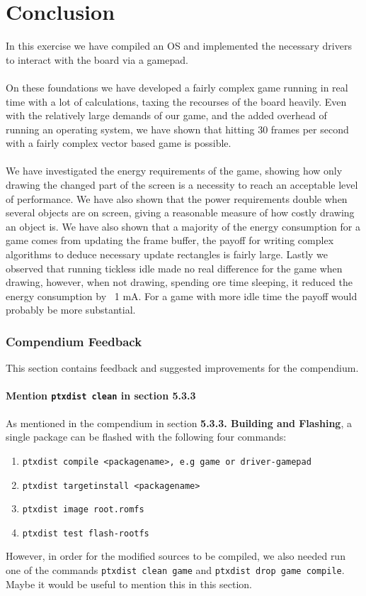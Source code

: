 \chapter{Conclusion}
In this exercise we have compiled an OS and implemented the necessary drivers to interact with the board via a gamepad.\\ \\
On these foundations we have developed a fairly complex game running in real time with a lot of calculations, taxing the recourses of the board heavily. Even with the relatively large demands of our game, and the added overhead of running an operating system, we have shown that hitting 30 frames per second with a fairly complex vector based game is possible.\\ \\
We have investigated the energy requirements of the game, showing how only drawing the changed part of the screen is a necessity to reach an acceptable level of performance. We have also shown that the power requirements double when several objects are on screen, giving a reasonable measure of how costly drawing an object is. We have also shown that a majority of the energy consumption for a game comes from updating the frame buffer, the payoff for writing complex algorithms to deduce necessary update rectangles is fairly large. Lastly we observed that running tickless idle made no real difference for the game when drawing, however, when not drawing, spending ore time sleeping, it reduced the energy consumption by ~1 mA. For a game with more idle time the payoff would probably be more substantial. \\ 

\subsection{Compendium Feedback}
This section contains feedback and suggested improvements for the compendium.

\subsubsection{Mention \texttt{ptxdist clean} in section 5.3.3}
As mentioned in the compendium in section \textbf{5.3.3. Building and Flashing}, a single package can be flashed with the following four commands:
\begin{enumerate}
  \item \texttt{ptxdist compile <packagename>, e.g game or driver-gamepad}
  \item \texttt{ptxdist targetinstall <packagename>}
  \item \texttt{ptxdist image root.romfs}
  \item \texttt{ptxdist test flash-rootfs}
\end{enumerate}
However, in order for the modified sources to be compiled, we also needed run one of the commands \texttt{ptxdist clean game} and \texttt{ptxdist drop game compile}. Maybe it would be useful to mention this in this section.

